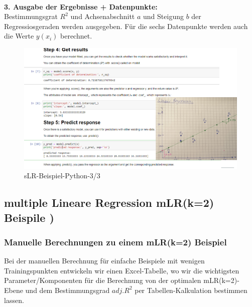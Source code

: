 \documentclass[12pt]{article}
\begin{document}
%
\\[1.2cm]
\hspace*{0.5cm} \textbf{3. Ausgabe der Ergebnisse + Datenpunkte:}\\
Bestimmungsgrat $R^2$ und Achsenabschnitt $a$ und Steigung $b$ der Regressiosgeraden werden ausgegeben. Für die sechs Datenpunkte werden auch die Werte $ y(x_i)$ berechnet. 
\begin{figure}[htp]
  \centering
  \hspace*{-0.8cm} 
  \includegraphics[width=1.2\textwidth]{sLR_Beispiel_Scikit-Learn-03}
  \caption{sLR-Beispiel-Python-3/3}
  \label{fig:sLR-SciKit-Learn02}
\end{figure}
\newpage

\subsection{multiple Lineare Regression mLR(k=2) Beispile )}

\subsubsection{Manuelle Berechnungen zu einem mLR(k=2) Beispiel}
%
Bei der manuellen Berechnung für einfache Beispiele mit wenigen  Trainingspunkten entwickeln wir einen Excel-Tabelle, wo wir die wichtigsten Parameter/Komponenten für die Berechnung von der optimalen mLR(k=2)-Ebene und dem Bestimmungsgrad $adj.R^2$ per Tabellen-Kalkulation bestimmen lassen.\\
\end{document}
